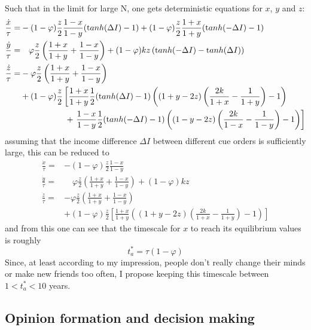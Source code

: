 Such that in the limit for large N, one gets deterministic equations for $x$, $y$ and $z$:
\begin{align}
	\frac{\dot{x}}{\tau} =& -(1-\varphi)\frac{z}{2}\frac{1-x}{1-y}({\mathrm tanh}(\Delta I)-1) + (1-\varphi)\frac{z}{2}\frac{1+x}{1+y}({\mathrm tanh}(-\Delta I)-1) \\
\frac{\dot{y}}{\tau} =& \quad \varphi\frac{z}{2}\left( \frac{1+x}{1+y} + \frac{1-x}{1-y} \right) + (1-\varphi)kz\left( {\mathrm tanh}(-\Delta I) - {\mathrm tanh}(\Delta I) \right) \\
	\frac{\dot{z}}{\tau} =& -\varphi\frac{z}{2}\left( \frac{1+x}{1+y} + \frac{1-x}{1-y} \right) \nonumber \\
	& + (1-\varphi)\frac{z}{2} \left[ \frac{1+x}{1+y} \frac{1}{2}({\mathrm tanh}(\Delta I)-1) \left( (1+y-2z)\left( \frac{2k}{1+x}-\frac{1}{1+y} \right)-1 \right) \right. \nonumber \\
	& \hspace{1.9 cm} + \left.\frac{1-x}{1-y}\frac{1}{2}({\mathrm tanh}(-\Delta I)-1)\left( (1-y-2z)\left( \frac{2k}{1-x}-\frac{1}{1-y} \right)-1 \right)  \right]
	\label{avm_ode}
\end{align}
assuming that the income difference $\Delta I$ between different cue orders is sufficiently large, this can be reduced to
\begin{align}
	\frac{\dot{x}}{\tau} =& -(1-\varphi)\frac{z}{2}\frac{1-x}{1-y} \\
\frac{\dot{y}}{\tau} =& \quad \varphi\frac{z}{2}\left( \frac{1+x}{1+y} + \frac{1-x}{1-y} \right) + (1-\varphi)kz \\
	\frac{\dot{z}}{\tau} =& -\varphi\frac{z}{2}\left( \frac{1+x}{1+y} + \frac{1-x}{1-y} \right) \nonumber \\
	& + (1-\varphi)\frac{z}{2} \left[ \frac{1+x}{1+y} \left( (1+y-2z)\left( \frac{2k}{1+x}-\frac{1}{1+y} \right)-1 \right) \right]
	\label{avm_ode_reduced}
\end{align}
and from this one can see that the timescale for $x$ to reach its equilibrium values is roughly 
\begin{equation}
	t_a^* = \tau(1-\varphi)
	\label{avm_timescale}
\end{equation}
Since, at least according to my impression, people don't really change their minds or make new friends too often, I propose keeping this timescale between $1<t_a^*<10$ years.
\fi
\newpage
\subsection{Opinion formation and decision making}
\label{sec:oppinion_formation_and_decision_making}

